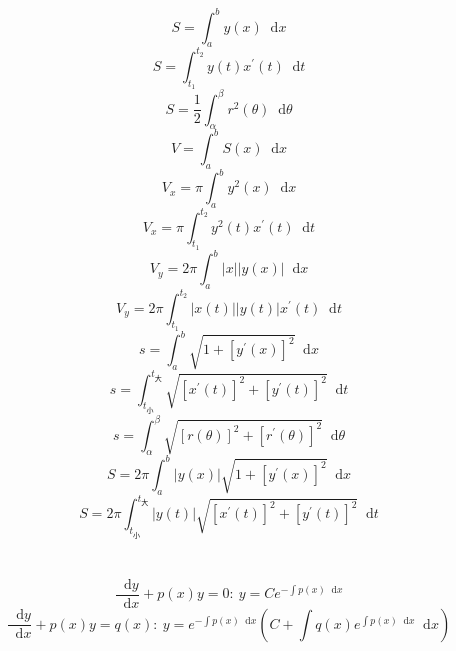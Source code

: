 \documentclass[]{article}
\newcommand*{\dif}{\mathop{}\!\mathrm{d}}
\numberwithin{equation}{section}
\begin{document}
\section{}
\begin{equation}
    S=\int_a^b y(x)\dif x
\end{equation}
\begin{equation}
    S=\int_{t_1}^{t_2}y(t)x^{'}(t)\dif t
\end{equation}
\begin{equation}
    S=\frac{1}{2}\int_\alpha^\beta r^2(\theta)\dif\theta
\end{equation}
\begin{equation}
    V=\int_a^b S(x)\dif x
\end{equation}
\begin{equation}
    V_x=\pi\int_a^b y^2(x)\dif x
\end{equation}
\begin{equation}
    V_x=\pi\int_{t_1}^{t_2}y^2(t)x^{'}(t)\dif t
\end{equation}
\begin{equation}
    V_y=2\pi\int_a^b\left|x\right|\left|y(x)\right|\dif x
\end{equation}
\begin{equation}
    V_y=2\pi\int_{t_1}^{t_2}\left|x(t)\right|\left|y(t)\right|x^{'}(t)\dif t
\end{equation}
\begin{equation}
    s=\int_a^b\sqrt{1+[y^{'}(x)]^2}\dif x
\end{equation}
\begin{equation}
    s=\int_{t_\text{小}}^{t_\text{大}}\sqrt{[x^{'}(t)]^2+[y^{'}(t)]^2}\dif t
\end{equation}
\begin{equation}
    s=\int_\alpha^\beta\sqrt{[r(\theta)]^2+[r^{'}(\theta)]^2}\dif\theta
\end{equation}
\begin{equation}
    S=2\pi\int_a^b\left|y(x)\right|\sqrt{1+[y^{'}(x)]^2}\dif x
\end{equation}
\begin{equation}
    S=2\pi\int_{t_\text{小}}^{t_\text{大}}\left|y(t)\right|\sqrt{[x^{'}(t)]^2+[y^{'}(t)]^2}\dif t
\end{equation}

\section{}
\begin{equation}
    \frac{\dif y}{\dif x}+p(x)y=0:\
    y=Ce^{-\int p(x)\dif x}
\end{equation}
\begin{equation}
    \frac{\dif y}{\dif x}+p(x)y=q(x):\
    y=e^{-\int p(x)\dif x}(C+\int q(x)e^{\int p(x)\dif x}\dif x)
\end{equation}
\end{document}
